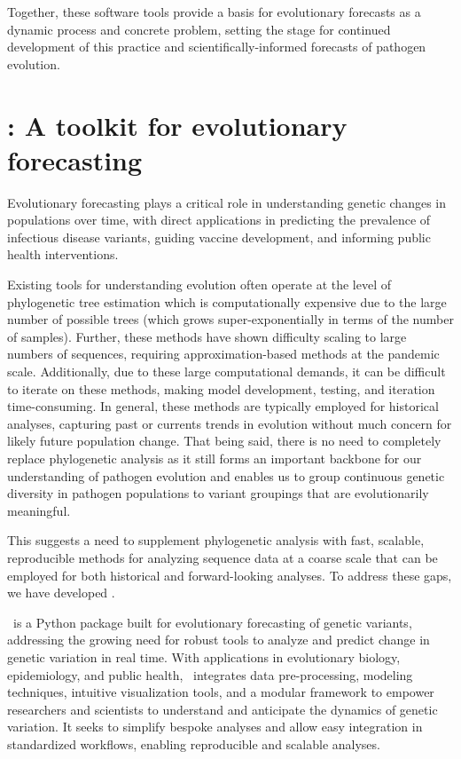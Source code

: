 Together, these software tools provide a basis for evolutionary forecasts as a dynamic process and concrete problem, setting the stage for continued development of this practice and scientifically-informed forecasts of pathogen evolution.

\section{\evofr: A toolkit for evolutionary forecasting}

Evolutionary forecasting plays a critical role in understanding genetic changes in populations over time, with direct applications in predicting the prevalence of infectious disease variants, guiding vaccine development, and informing public health interventions.

Existing tools for understanding evolution often operate at the level of phylogenetic tree estimation which is computationally expensive due to the large number of possible trees (which grows super-exponentially in terms of the number of samples).
Further, these methods have shown difficulty scaling to large numbers of sequences, requiring approximation-based methods at the pandemic scale. \cite{DeMaio2023}
Additionally, due to these large computational demands, it can be difficult to iterate on these methods, making model development, testing, and iteration time-consuming.
In general, these methods are typically employed for historical analyses, capturing past or currents trends in evolution without much concern for likely future population change.
That being said, there is no need to completely replace phylogenetic analysis as it still forms an important backbone for our understanding of pathogen evolution and enables us to group continuous genetic diversity in pathogen populations to variant groupings that are evolutionarily meaningful.

This suggests a need to supplement phylogenetic analysis with fast, scalable, reproducible methods for analyzing sequence data at a coarse scale that can be employed for both historical and forward-looking analyses.
To address these gaps, we have developed \evofr.

\evofr\ is a Python package built for evolutionary forecasting of genetic variants, addressing the growing need for robust tools to analyze and predict change in genetic variation in real time.
With applications in evolutionary biology, epidemiology, and public health, \evofr\ integrates data pre-processing, modeling techniques, intuitive visualization tools, and a modular framework to empower researchers and scientists to understand and anticipate the dynamics of genetic variation.
It seeks to simplify bespoke analyses and allow easy integration in standardized workflows, enabling reproducible and scalable analyses.

